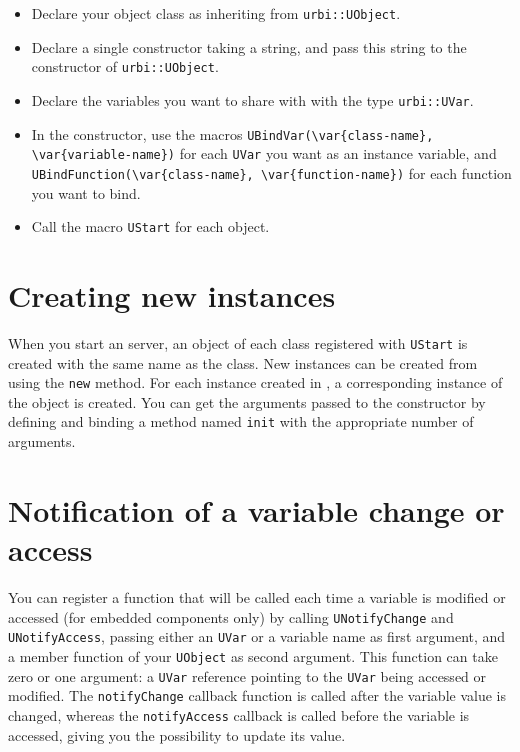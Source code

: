 \begin{itemize}
\item Declare your object class as inheriting from
  \lstinline{urbi::UObject}.
\item Declare a single constructor taking a string, and pass this
  string to the constructor of \lstinline{urbi::UObject}.
\item Declare the variables you want to share with \urbi with the type
  \lstinline{urbi::UVar}.
\item In the constructor, use the macros
  \lstinline|UBindVar(\var{class-name}, \var{variable-name})|
  for each \lstinline{UVar} you want as an instance variable, and
  \lstinline|UBindFunction(\var{class-name}, \var{function-name})| for
  each function you want to bind.
\item Call the macro \lstinline{UStart} for each object.
\end{itemize}

\section{Creating new instances}

When you start an \urbi server, an object of each class registered
with \lstinline{UStart} is created with the same name as the
class. New instances can be created from \urbi using the
\lstinline|new| method. For each instance created in \urbi, a
corresponding instance of the \Cxx object is created. You can get the
arguments passed to the constructor by defining and binding a method
named \lstinline|init| with the appropriate number of arguments.

\section{Notification of a variable change or access}

You can register a function that will be called each time a variable
is modified or accessed (for embedded components only) by calling
\lstinline{UNotifyChange} and \lstinline{UNotifyAccess}, passing
either an \lstinline{UVar} or a variable name as first argument, and a
member function of your \lstinline{UObject} as second argument. This
function can take zero or one argument: a \lstinline{UVar} reference
pointing to the \lstinline{UVar} being accessed or modified. The
\lstinline{notifyChange} callback function is called after the
variable value is changed, whereas the \lstinline{notifyAccess}
callback is called before the variable is accessed, giving you the
possibility to update its value.

